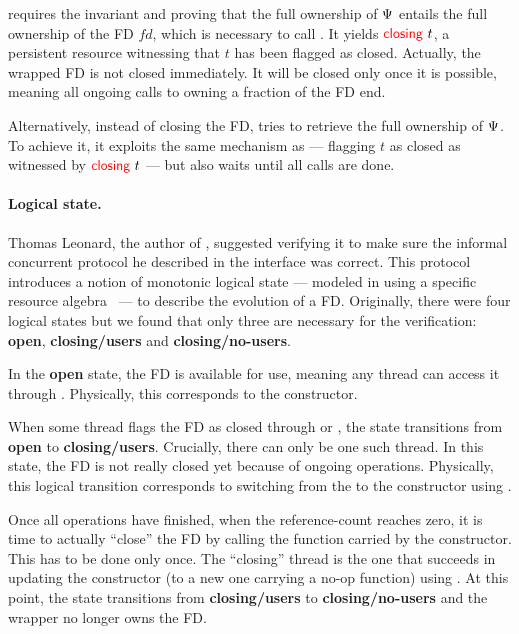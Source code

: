 requires the invariant and proving that the full ownership of $\Psi$ entails the full ownership of the FD $\mathit{fd}$, which is necessary to call .
It yields $\textcolor{red}{\textsf{\upshape closing}}\ t$, a persistent resource witnessing that $t$ has been flagged as closed.
Actually, the wrapped FD is not closed immediately.
It will be closed only once it is possible, meaning all ongoing calls to  owning a fraction of the FD end.

Alternatively, instead of closing the FD,  tries to retrieve the full ownership of $\Psi$.
To achieve it, it exploits the same mechanism as  --- flagging $t$ as closed as witnessed by $\textcolor{red}{\textsf{\upshape closing}}\ t$ --- but also waits until all  calls are done.

\paragraph{Logical state.}
Thomas Leonard, the author of , suggested verifying it to make sure the informal concurrent protocol he described in the \OCaml interface was correct.
This protocol introduces a notion of monotonic logical state --- modeled in \Iris using a specific resource algebra~\cite{DBLP:conf/cpp/TimanyB21} --- to describe the evolution of a FD.
Originally, there were four logical states but we found that only three are necessary for the verification: \textbf{open}, \textbf{closing/users} and \textbf{closing/no-users}.

In the \textbf{open} state, the FD is available for use, meaning any thread can access it through .
Physically, this corresponds to the  constructor.

When some thread flags the FD as closed through  or , the state transitions from \textbf{open} to \textbf{closing/users}.
Crucially, there can only be one such thread.
In this state, the FD is not really closed yet because of ongoing  operations.
Physically, this logical transition corresponds to switching from the  to the  constructor using .

Once all  operations have finished, when the reference-count reaches zero, it is time to actually ``close'' the FD by calling the function carried by the  constructor.
This has to be done only once.
The ``closing'' thread is the one that succeeds in updating the  constructor (to a new one carrying a no-op function) using .
At this point, the state transitions from \textbf{closing/users} to \textbf{closing/no-users} and the wrapper no longer owns the FD.

